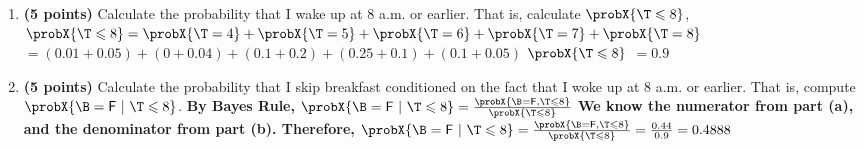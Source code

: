 \documentclass[11pt]{article}
\begin{document}
\begin{enumerate}
\begin{enumerate}
  \item {\bfseries (5 points)} Calculate the probability that I wake up at 8 a.m. or earlier. That is, calculate $\probX{\T\leq 8}$,    \newline
      {\bfseries
        \newline
        $\probX{\T\leq 8} = \probX{\T= 4} + \probX{\T= 5} + \probX{\T= 6} + \probX{\T= 7} + \probX{\T= 8}$
        \newline
        $= (0.01 + 0.05) + (0 + 0.04) + (0.1 + 0.2) + (0.25 + 0.1) + (0.1 + 0.05)$
        \newline
        \newline
        $\probX{\T\leq 8}$ $= 0.9$
      }
  \vspace{0.5\textheight}

  \item {\bfseries (5 points)} Calculate the probability that I skip breakfast conditioned on the fact that I woke up at 8 a.m. or earlier. 
    That is, compute $\probX{\B=\pred F ~|~ \T\leq 8}$.   \newline
    {\bfseries
      \newline
      By Bayes Rule, \newline
      $\probX{\B=\pred F ~|~ \T\leq 8} = \frac{\probX{\B=\pred F, \T\leq 8}}{\probX{\T\leq 8}}$ \newline \newline
      We know the numerator from part (a), and the denominator from part (b). Therefore, \newline
      $\probX{\B=\pred F ~|~ \T\leq 8} = \frac{\probX{\B=\pred F, \T\leq 8}}{\probX{\T\leq 8}} = \frac{0.44}{0.9} = 0.4888$
    }
  \newpage
  \end{enumerate} 
  

\end{enumerate}
\end{document}

